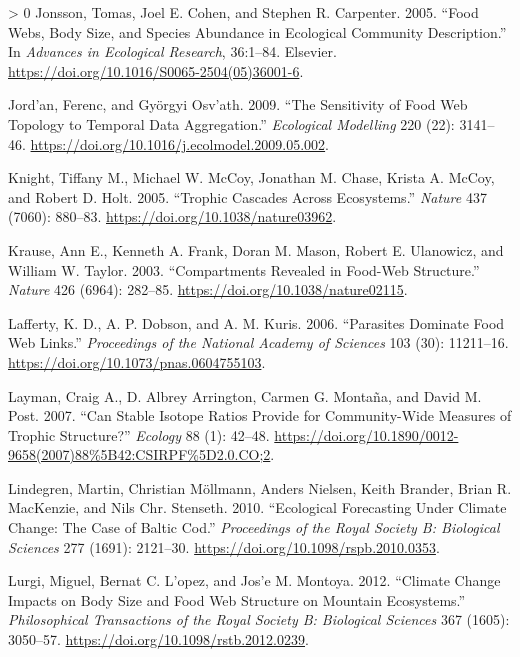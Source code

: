\documentclass{article}
\newlength{\cslhangindent}
\newenvironment{CSLReferences}[3] %
 {%
  \setlength{\parindent}{0pt}
  \ifodd #1 \everypar{\setlength{\hangindent}{\cslhangindent}}\ignorespaces\fi
  \ifnum #2 > 0
  \setlength{\parskip}{#2\baselineskip}
  \fi
 }%
 {}
\begin{document}
\begin{CSLReferences}{1}{0}
\leavevmode\hypertarget{ref-jonssonFoodWebsBody2005}{}%
Jonsson, Tomas, Joel E. Cohen, and Stephen R. Carpenter. 2005. {``Food
{Webs}, {Body Size}, and {Species Abundance} in {Ecological Community
Description}.''} In \emph{Advances in {Ecological Research}}, 36:1--84.
{Elsevier}. \url{https://doi.org/10.1016/S0065-2504(05)36001-6}.

\leavevmode\hypertarget{ref-jordanSensitivityFoodWeb2009}{}%
Jord'an, Ferenc, and Györgyi Osv'ath. 2009. {``The Sensitivity of Food
Web Topology to Temporal Data Aggregation.''} \emph{Ecological
Modelling} 220 (22): 3141--46.
\url{https://doi.org/10.1016/j.ecolmodel.2009.05.002}.

\leavevmode\hypertarget{ref-knightTrophicCascadesEcosystems2005}{}%
Knight, Tiffany M., Michael W. McCoy, Jonathan M. Chase, Krista A.
McCoy, and Robert D. Holt. 2005. {``Trophic Cascades Across
Ecosystems.''} \emph{Nature} 437 (7060): 880--83.
\url{https://doi.org/10.1038/nature03962}.

\leavevmode\hypertarget{ref-krauseCompartmentsRevealedFoodweb2003}{}%
Krause, Ann E., Kenneth A. Frank, Doran M. Mason, Robert E. Ulanowicz,
and William W. Taylor. 2003. {``Compartments Revealed in Food-Web
Structure.''} \emph{Nature} 426 (6964): 282--85.
\url{https://doi.org/10.1038/nature02115}.

\leavevmode\hypertarget{ref-laffertyParasitesDominateFood2006}{}%
Lafferty, K. D., A. P. Dobson, and A. M. Kuris. 2006. {``Parasites
Dominate Food Web Links.''} \emph{Proceedings of the National Academy of
Sciences} 103 (30): 11211--16.
\url{https://doi.org/10.1073/pnas.0604755103}.

\leavevmode\hypertarget{ref-laymanCanStableIsotope2007}{}%
Layman, Craig A., D. Albrey Arrington, Carmen G. Montaña, and David M.
Post. 2007. {``Can {Stable Isotope Ratios Provide} for {Community}-{Wide
Measures} of {Trophic Structure}?''} \emph{Ecology} 88 (1): 42--48.
\url{https://doi.org/10.1890/0012-9658(2007)88\%5B42:CSIRPF\%5D2.0.CO;2}.

\leavevmode\hypertarget{ref-lindegrenEcologicalForecastingClimate2010}{}%
Lindegren, Martin, Christian Möllmann, Anders Nielsen, Keith Brander,
Brian R. MacKenzie, and Nils Chr. Stenseth. 2010. {``Ecological
Forecasting Under Climate Change: The Case of {Baltic} Cod.''}
\emph{Proceedings of the Royal Society B: Biological Sciences} 277
(1691): 2121--30. \url{https://doi.org/10.1098/rspb.2010.0353}.

\leavevmode\hypertarget{ref-lurgiClimateChangeImpacts2012}{}%
Lurgi, Miguel, Bernat C. L'opez, and Jos'e M. Montoya. 2012. {``Climate
Change Impacts on Body Size and Food Web Structure on Mountain
Ecosystems.''} \emph{Philosophical Transactions of the Royal Society B:
Biological Sciences} 367 (1605): 3050--57.
\url{https://doi.org/10.1098/rstb.2012.0239}.


\end{CSLReferences}
\end{document}
